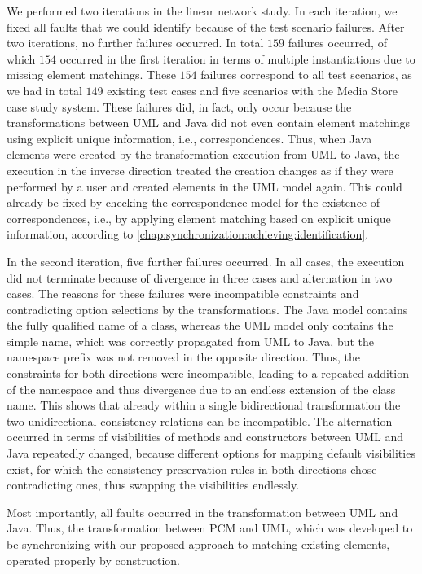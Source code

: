 We performed two iterations in the linear network study.
In each iteration, we fixed all faults that we could identify because of the test scenario failures.
After two iterations, no further failures occurred.
In total $159$ failures occurred, of which $154$ occurred in the first iteration in terms of multiple instantiations due to missing element matchings.
These $154$ failures correspond to all test scenarios, as we had in total $149$ existing test cases and five scenarios with the Media Store case study system.
These failures did, in fact, only occur because the transformations between \gls{UML} and Java did not even contain element matchings using explicit unique information, i.e., correspondences.
Thus, when Java elements were created by the transformation execution from \gls{UML} to Java, the execution in the inverse direction treated the creation changes as if they were performed by a user and created elements in the \gls{UML} model again.
This could already be fixed by checking the correspondence model for the existence of correspondences, i.e., by applying element matching based on explicit unique information, according to \autoref{chap:synchronization:achieving:identification}.

In the second iteration, five further failures occurred.
In all cases, the execution did not terminate because of divergence in three cases and alternation in two cases.
The reasons for these failures were incompatible constraints and contradicting option selections by the transformations.
The Java model contains the fully qualified name of a class, whereas the \gls{UML} model only contains the simple name, which was correctly propagated from \gls{UML} to Java, but the namespace prefix was not removed in the opposite direction.
Thus, the constraints for both directions were incompatible, leading to a repeated addition of the namespace and thus divergence due to an endless extension of the class name.
This shows that already within a single bidirectional transformation the two unidirectional consistency relations can be incompatible.
The alternation occurred in terms of visibilities of methods and constructors between \gls{UML} and Java repeatedly changed, because different options for mapping default visibilities exist, for which the consistency preservation rules in both directions chose contradicting ones, thus swapping the visibilities endlessly.

Most importantly, all faults occurred in the transformation between \gls{UML} and Java.
Thus, the transformation between \gls{PCM} and \gls{UML}, which was developed to be synchronizing with our proposed approach to matching existing elements, operated properly by construction.

